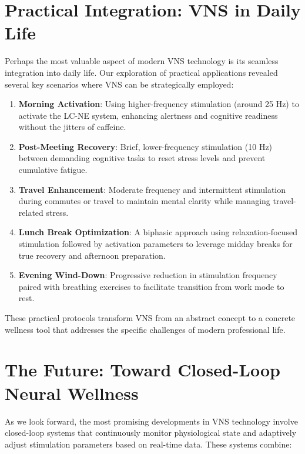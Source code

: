 \documentclass[
  Letterpaper,
]{scrbook}
\begin{document}
\section{Practical Integration: VNS in Daily
Life}\label{practical-integration-vns-in-daily-life}

Perhaps the most valuable aspect of modern VNS technology is its
seamless integration into daily life. Our exploration of practical
applications revealed several key scenarios where VNS can be
strategically employed:

\begin{enumerate}
\def\labelenumi{\arabic{enumi}.}
\item
  \textbf{Morning Activation}: Using higher-frequency stimulation
  (around 25 Hz) to activate the LC-NE system, enhancing alertness and
  cognitive readiness without the jitters of caffeine.
\item
  \textbf{Post-Meeting Recovery}: Brief, lower-frequency stimulation (10
  Hz) between demanding cognitive tasks to reset stress levels and
  prevent cumulative fatigue.
\item
  \textbf{Travel Enhancement}: Moderate frequency and intermittent
  stimulation during commutes or travel to maintain mental clarity while
  managing travel-related stress.
\item
  \textbf{Lunch Break Optimization}: A biphasic approach using
  relaxation-focused stimulation followed by activation parameters to
  leverage midday breaks for true recovery and afternoon preparation.
\item
  \textbf{Evening Wind-Down}: Progressive reduction in stimulation
  frequency paired with breathing exercises to facilitate transition
  from work mode to rest.
\end{enumerate}

These practical protocols transform VNS from an abstract concept to a
concrete wellness tool that addresses the specific challenges of modern
professional life.

\section{The Future: Toward Closed-Loop Neural
Wellness}\label{the-future-toward-closed-loop-neural-wellness}

As we look forward, the most promising developments in VNS technology
involve closed-loop systems that continuously monitor physiological
state and adaptively adjust stimulation parameters based on real-time
data. These systems combine:
\end{document}
